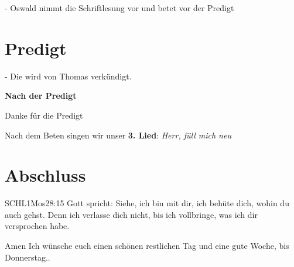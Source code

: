 - Oswald nimmt die Schriftlesung vor und betet vor der Predigt

\section{Predigt}
- Die wird von Thomas verkündigt.

\textbf{Nach der Predigt}

Danke für die Predigt

Nach dem Beten singen wir unser \textbf{3. Lied}: \textit{Herr, füll mich neu}\\

\section{Abschluss}

\begin{bibelbox}{SCHL}{1Mos}{28:15}
Gott spricht: Siehe, ich bin mit dir,
ich behüte dich, wohin du auch gehst.
Denn ich verlasse dich nicht,
bis ich vollbringe, was ich dir versprochen habe.
\end{bibelbox}
Amen
Ich wünsche euch einen schönen restlichen Tag und eine gute Woche, bis Donnerstag..
